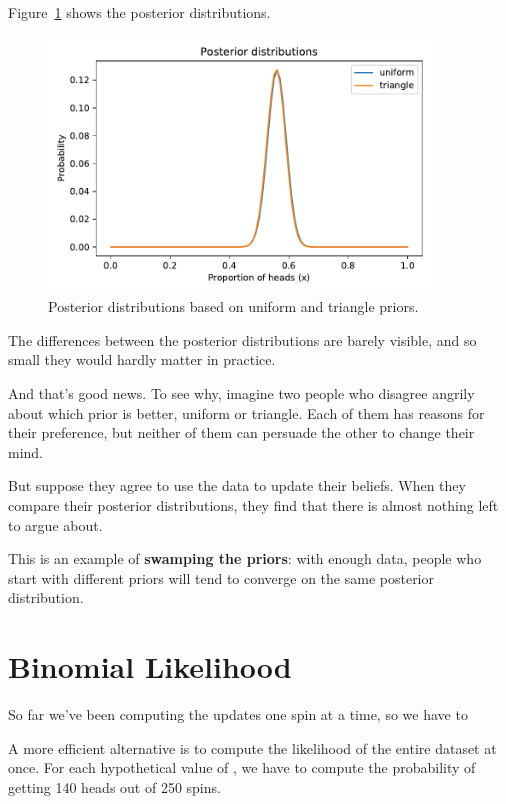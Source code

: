 \documentclass[12pt]{book}
\theoremstyle{exercise}
\begin{document}
Figure~\ref{fig03-04} shows the posterior distributions.

\begin{figure}
\centerline{\includegraphics[width=4in]{figs/fig03-04.pdf}}
\caption{Posterior distributions based on uniform and triangle priors.}
\label{fig03-04}
\end{figure}

The differences between the posterior distributions are barely visible, and so small they would hardly matter in practice.

And that's good news.
To see why, imagine two people who disagree angrily about which prior is better, uniform or triangle.
Each of them has reasons for their preference, but neither of them can persuade the other to change their mind.

But suppose they agree to use the data to update their beliefs.
When they compare their posterior distributions, they find that there is almost nothing left to argue about.

This is an example of {\bf swamping the priors}: with enough
data, people who start with different priors will tend to
converge on the same posterior distribution.



\section{Binomial Likelihood}

So far we've been computing the updates one spin at a time, so we have to 

A more efficient alternative is to compute the likelihood of the entire dataset at once.
For each hypothetical value of , we have to compute the probability of getting 140 heads out of 250 spins.
\end{document}
